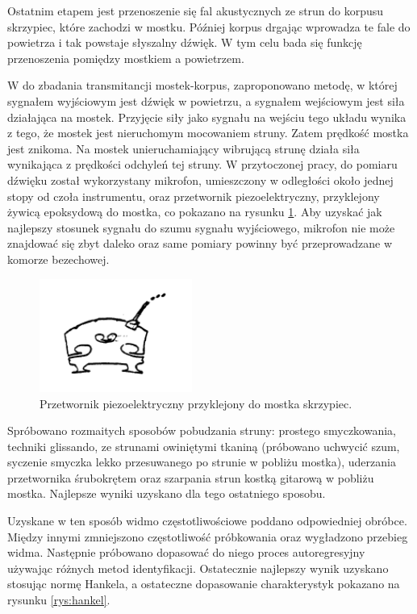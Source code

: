 Ostatnim etapem jest przenoszenie się fal akustycznych ze strun do korpusu skrzypiec, które zachodzi w mostku. Później korpus drgając wprowadza te fale do powietrza i tak powstaje słyszalny dźwięk. W tym celu bada się funkcję przenoszenia pomiędzy mostkiem a powietrzem. 

W \cite{bowed_smith} do zbadania transmitancji mostek-korpus, zaproponowano metodę, w której sygnałem wyjściowym jest dźwięk w powietrzu, a sygnałem wejściowym jest siła działająca na mostek. Przyjęcie siły jako sygnału na wejściu tego układu wynika z tego, że mostek jest nieruchomym mocowaniem struny. Zatem prędkość mostka jest znikoma. Na mostek unieruchamiający wibrującą strunę działa siła wynikająca z prędkości odchyleń tej struny. W przytoczonej pracy, do pomiaru dźwięku został wykorzystany mikrofon, umieszczony w odległości około jednej stopy od czoła instrumentu, oraz przetwornik piezoelektryczny, przyklejony żywicą epoksydową do mostka, co pokazano na rysunku \ref{rys:pomiary}. Aby uzyskać jak najlepszy stosunek sygnału do szumu sygnału wyjściowego, mikrofon nie może znajdować się zbyt daleko oraz same pomiary powinny być przeprowadzane w komorze bezechowej.

\begin{figure}[H]
	\centering
	\includegraphics[width=5cm]{grafiki/pomiary}
	\captionsetup{justification=centering}
	\caption{Przetwornik piezoelektryczny przyklejony do mostka skrzypiec.}
	\label{rys:pomiary}
\end{figure}

Spróbowano rozmaitych sposobów pobudzania struny: prostego smyczkowania, techniki glissando, ze strunami owiniętymi tkaniną (próbowano uchwycić szum, syczenie smyczka lekko przesuwanego po strunie w pobliżu mostka), uderzania przetwornika śrubokrętem oraz szarpania strun kostką gitarową w pobliżu mostka. Najlepsze wyniki uzyskano dla tego ostatniego sposobu.

Uzyskane w ten sposób widmo częstotliwościowe poddano odpowiedniej obróbce. Między innymi zmniejszono częstotliwość próbkowania oraz wygładzono przebieg widma. Następnie próbowano dopasować do niego proces autoregresyjny używając różnych metod identyfikacji. Ostatecznie najlepszy wynik uzyskano stosując normę Hankela, a ostateczne dopasowanie charakterystyk pokazano na rysunku \ref{rys:hankel}.

